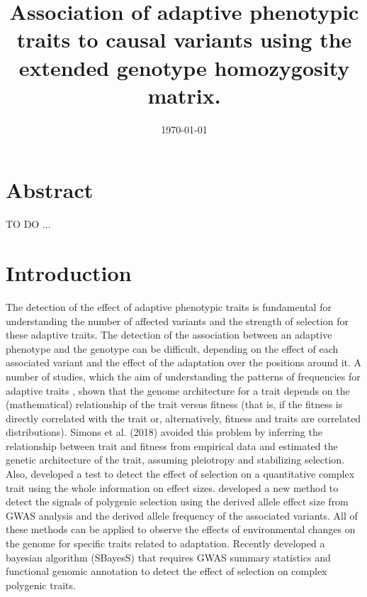 \documentclass[a4paper,11pt]{article}
\begin{document}
\title{Association of adaptive phenotypic traits to causal variants using the extended genotype homozygosity matrix.}
\date{\today}
\maketitle

\section{Abstract}

TO DO ...

\section{Introduction}

The detection of the effect of adaptive phenotypic traits is fundamental for understanding the number of affected variants and the strength of selection for these adaptive traits. The detection of the association between an adaptive phenotype and the genotype can be difficult, depending on the effect of each associated variant and the effect of the adaptation over the positions around it. A number of studies, which the aim of understanding the patterns of frequencies for adaptive traits  \citep[\textit{e.g.},][]{Eyre-Walker:2010aa,Caballero:2015aa,Lourenco:2011aa,Connallon:2015aa}, shown that the genome architecture for a trait depends on the (mathematical) relationship of the trait versus fitness (that is, if the fitness is directly correlated with the trait or, alternatively, fitness and traits are correlated distributions). Simons et al. (2018) avoided this problem by inferring the relationship between trait and fitness from empirical data and estimated the genetic architecture of the trait, assuming pleiotropy and stabilizing selection. Also, \citet{Beissinger:2018aa} developed a test to detect the effect of selection on a quantitative complex trait using the whole information on effect sizes.\citet{Uricchio:2019aa}  developed a new method to detect the signals of polygenic selection using the derived allele effect size from GWAS analysis and the derived allele frequency of the associated variants. All of these methods can be applied to observe the effects of environmental changes on the genome for specific traits related to adaptation. Recently \citet{Zeng752527} developed a bayesian algorithm (SBayesS) that requires GWAS summary statistics and functional genomic annotation to detect the effect of selection on complex polygenic traits. 
\end{document}
